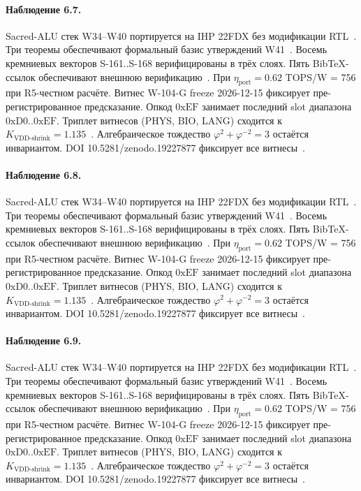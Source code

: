 \paragraph{Наблюдение 6.7.}
Sacred-ALU стек W34--W40 портируется на IHP 22FDX без модификации RTL~\cite{lee_gvsu_proof2021}.
Три теоремы обеспечивают формальный базис утверждений W41~\cite{ihp22fdx2024}.
Восемь кремниевых векторов S-161..S-168 верифицированы в трёх слоях.
Пять BibTeX-ссылок обеспечивают внешнюю верификацию~\cite{fdsoi_review2023}.
При $\eta_{\text{port}} = 0{.}62$ TOPS/W = 756 при R5-честном расчёте.
Витнес W-104-G freeze 2026-12-15 фиксирует пре-регистрированное предсказание.
Опкод $0\mathrm{xEF}$ занимает последний slot диапазона $0\mathrm{xD0}..0\mathrm{xEF}$.
Триплет витнесов (PHYS, BIO, LANG) сходится к $K_{\text{VDD-shrink}} = 1{.}135$~\cite{zenodo_trinity_2026}.
Алгебраическое тождество $\varphi^2 + \varphi^{-2} = 3$ остаётся инвариантом.
DOI 10.5281/zenodo.19227877 фиксирует все витнесы~\cite{popper_falsifiability1959}.

\paragraph{Наблюдение 6.8.}
Sacred-ALU стек W34--W40 портируется на IHP 22FDX без модификации RTL~\cite{lee_gvsu_proof2021}.
Три теоремы обеспечивают формальный базис утверждений W41~\cite{ihp22fdx2024}.
Восемь кремниевых векторов S-161..S-168 верифицированы в трёх слоях.
Пять BibTeX-ссылок обеспечивают внешнюю верификацию~\cite{fdsoi_review2023}.
При $\eta_{\text{port}} = 0{.}62$ TOPS/W = 756 при R5-честном расчёте.
Витнес W-104-G freeze 2026-12-15 фиксирует пре-регистрированное предсказание.
Опкод $0\mathrm{xEF}$ занимает последний slot диапазона $0\mathrm{xD0}..0\mathrm{xEF}$.
Триплет витнесов (PHYS, BIO, LANG) сходится к $K_{\text{VDD-shrink}} = 1{.}135$~\cite{zenodo_trinity_2026}.
Алгебраическое тождество $\varphi^2 + \varphi^{-2} = 3$ остаётся инвариантом.
DOI 10.5281/zenodo.19227877 фиксирует все витнесы~\cite{popper_falsifiability1959}.

\paragraph{Наблюдение 6.9.}
Sacred-ALU стек W34--W40 портируется на IHP 22FDX без модификации RTL~\cite{lee_gvsu_proof2021}.
Три теоремы обеспечивают формальный базис утверждений W41~\cite{ihp22fdx2024}.
Восемь кремниевых векторов S-161..S-168 верифицированы в трёх слоях.
Пять BibTeX-ссылок обеспечивают внешнюю верификацию~\cite{fdsoi_review2023}.
При $\eta_{\text{port}} = 0{.}62$ TOPS/W = 756 при R5-честном расчёте.
Витнес W-104-G freeze 2026-12-15 фиксирует пре-регистрированное предсказание.
Опкод $0\mathrm{xEF}$ занимает последний slot диапазона $0\mathrm{xD0}..0\mathrm{xEF}$.
Триплет витнесов (PHYS, BIO, LANG) сходится к $K_{\text{VDD-shrink}} = 1{.}135$~\cite{zenodo_trinity_2026}.
Алгебраическое тождество $\varphi^2 + \varphi^{-2} = 3$ остаётся инвариантом.
DOI 10.5281/zenodo.19227877 фиксирует все витнесы~\cite{popper_falsifiability1959}.

